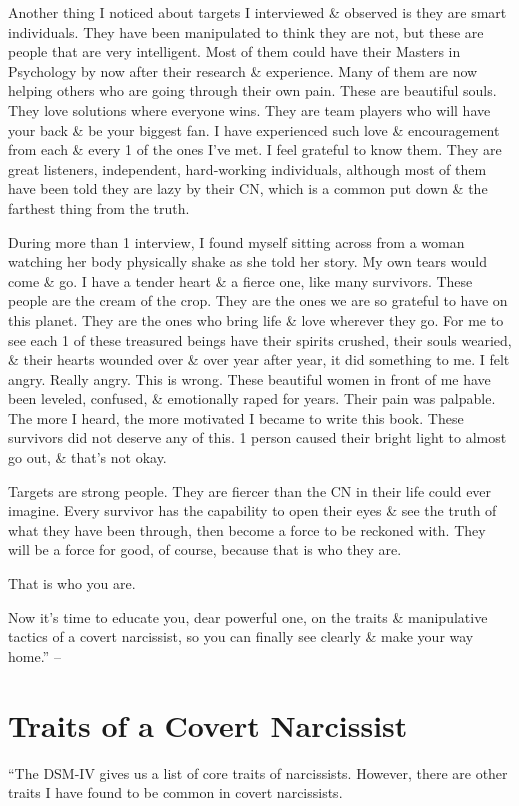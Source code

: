\documentclass{article}
\numberwithin{equation}{section}
\begin{document}
Another thing I noticed about targets I interviewed \& observed is they are smart individuals. They have been manipulated to think they are not, but these are people that are very intelligent. Most of them could have their Masters in Psychology by now after their research \& experience. Many of them are now helping others who are going through their own pain. These are beautiful souls. They love solutions where everyone wins. They are team players who will have your back \& be your biggest fan. I have experienced such love \& encouragement from each \& every 1 of the ones I've met. I feel grateful to know them. They are great listeners, independent, hard-working individuals, although most of them have been told they are lazy by their CN, which is a common put down \& the farthest thing from the truth.

During more than 1 interview, I found myself sitting across from a woman watching her body physically shake as she told her story. My own tears would come \& go. I have a tender heart \& a fierce one, like many survivors. These people are the cream of the crop. They are the ones we are so grateful to have on this planet. They are the ones who bring life \& love wherever they go. For me to see each 1 of these treasured beings have their spirits crushed, their souls wearied, \& their hearts wounded over \& over year after year, it did something to me. I felt angry. Really angry. This is wrong. These beautiful women in front of me have been leveled, confused, \& emotionally raped for years. Their pain was palpable. The more I heard, the more motivated I became to write this book. These survivors did not deserve any of this. 1 person caused their bright light to almost go out, \& that's not okay.

Targets are strong people. They are fiercer than the CN in their life could ever imagine. Every survivor has the capability to open their eyes \& see the truth of what they have been through, then become a force to be reckoned with. They will be a force for good, of course, because that is who they are.

That is who you are.

Now it's time to educate you, dear powerful one, on the traits \& manipulative tactics of a covert narcissist, so you can finally see clearly \& make your way home.'' -- \cite[pp. 46--50]{Mirza2017}


\section{Traits of a Covert Narcissist}
``The DSM-IV gives us a list of core traits of narcissists. However, there are other traits I have found to be common in covert narcissists.
\end{document}
